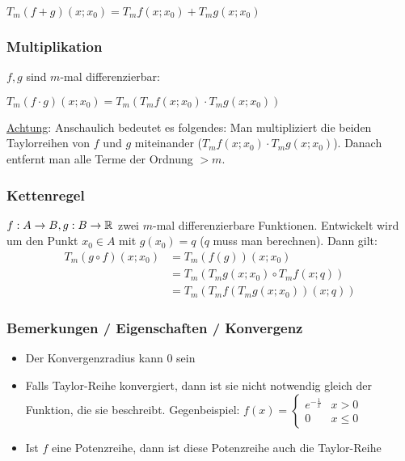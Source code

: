 $T_m (f + g)(x;x_0) = T_m f(x;x_0) + T_m g(x;x_0)$

\pagebreak
\subsubsection{Multiplikation}
$f, g$ sind $m$-mal differenzierbar:

$T_m (f \cdot g)(x;x_0) = T_m(T_m f(x;x_0) \cdot T_m g(x;x_0))$

\underline{Achtung}: Anschaulich bedeutet es folgendes: Man
multipliziert die beiden Taylorreihen von $f$ und $g$ miteinander ($T_m f(x;x_0) \cdot T_m g(x;x_0)$).
Danach entfernt man alle Terme der Ordnung $> m$.

\subsubsection{Kettenregel}
$f: A \to B, g: B \to \mathbb{R}$ zwei $m$-mal differenzierbare Funktionen.
Entwickelt wird um den Punkt $x_0 \in A$ mit $g(x_0) = q$ ($q$ muss man berechnen).
Dann gilt:
\begin{align*}
T_m (g \circ f)(x;x_0) &= T_m (f(g))(x;x_0)\\
&= T_m(T_m g(x;x_0) \circ T_m f(x;q))\\
& = T_m(T_m f(T_m g(x;x_0))(x;q))
\end{align*}

\subsubsection{Bemerkungen / Eigenschaften / Konvergenz}
\begin{itemize}
	\item Der Konvergenzradius kann 0 sein
	\item Falls Taylor-Reihe konvergiert, dann ist sie nicht notwendig gleich
	der Funktion, die sie beschreibt. Gegenbeispiel:
	$f(x) = \begin{cases}
	e^{-\frac{1}{x}} & x > 0\\
	0 & x \leq 0\end{cases}$
	\item Ist $f$ eine Potenzreihe, dann ist diese Potenzreihe auch die Taylor-Reihe
\end{itemize}
